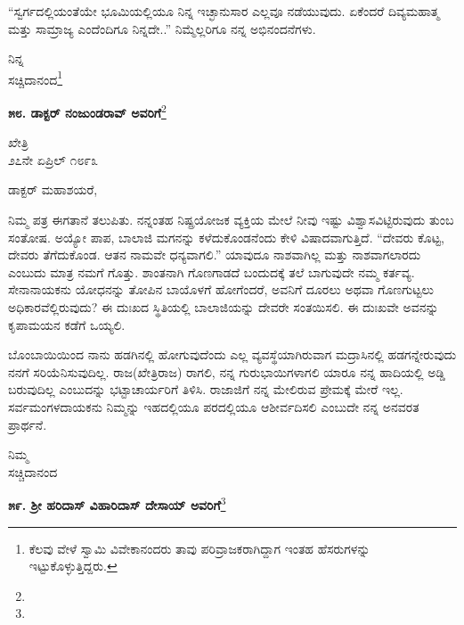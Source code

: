 “ಸ್ವರ್ಗದಲ್ಲಿಯಂತೆಯೇ ಭೂಮಿಯಲ್ಲಿಯೂ ನಿನ್ನ ಇಚ್ಛಾನುಸಾರ ಎಲ್ಲವೂ ನಡೆಯುವುದು. ಏಕೆಂದರೆ ದಿವ್ಯಮಹಾತ್ಮ ಮತ್ತು ಸಾಮ್ರಾಜ್ಯ ಎಂದೆಂದಿಗೂ ನಿನ್ನದೇ..” ನಿಮ್ಮೆಲ್ಲರಿಗೂ ನನ್ನ ಅಭಿನಂದನೆಗಳು.

\vspace{-0.45cm}

{\flushright
ನಿನ್ನ\\ಸಚ್ಚಿದಾನಂದ\footnote{ಕೆಲವು ವೇಳೆ ಸ್ವಾಮಿ ವಿವೇಕಾನಂದರು ತಾವು ಪರಿವ್ರಾಜಕರಾಗಿದ್ದಾಗ ಇಂತಹ ಹೆಸರುಗಳನ್ನು ಇಟ್ಟುಕೊಳ್ಳುತ್ತಿದ್ದರು.}\par}

\begin{center}
\textbf{೫೮. ಡಾಕ್ಟರ್ ನಂಜುಂಡರಾವ್ ಅವರಿಗೆ}\footnote{}
\end{center}

\vspace{-0.5cm}

\begin{flushright}
ಖೇತ್ರಿ\\೨೭ನೇ ಏಪ್ರಿಲ್ ೧೮೯೩
\end{flushright}

\noindent
ಡಾಕ್ಟರ್ ಮಹಾಶಯರೆ,

ನಿಮ್ಮ ಪತ್ರ ಈಗತಾನೆ ತಲುಪಿತು. ನನ್ನಂತಹ ನಿಷ್ಪ್ರಯೋಜಕ ವ್ಯಕ್ತಿಯ ಮೇಲೆ ನೀವು ಇಷ್ಟು ವಿಶ್ವಾಸವಿಟ್ಟಿರುವುದು ತುಂಬ ಸಂತೋಷ. ಅಯ್ಯೋ ಪಾಪ, ಬಾಲಾಜಿ ಮಗನನ್ನು ಕಳೆದುಕೊಂಡನೆಂದು ಕೇಳಿ ವಿಷಾದವಾಗುತ್ತಿದೆ. “ದೇವರು ಕೊಟ್ಟ, ದೇವರು ತೆಗೆದುಕೊಂಡ. ಆತನ ನಾಮವೇ ಧನ್ಯವಾಗಲಿ.” ಯಾವುದೂ ನಾಶವಾಗಿಲ್ಲ ಮತ್ತು ನಾಶವಾಗಲಾರದು ಎಂಬುದು ಮಾತ್ರ ನಮಗೆ ಗೊತ್ತು. ಶಾಂತನಾಗಿ ಗೊಣಗಾಡದೆ ಬಂದುದಕ್ಕೆ ತಲೆ ಬಾಗುವುದೇ ನಮ್ಮ ಕರ್ತವ್ಯ. ಸೇನಾನಾಯಕನು ಯೋಧನನ್ನು ತೋಪಿನ ಬಾಯೊಳಗೆ ಹೋಗೆಂದರೆ, ಅವನಿಗೆ ದೂರಲು ಅಥವಾ ಗೊಣಗುಟ್ಟಲು ಅಧಿಕಾರವೆಲ್ಲಿರುವುದು? ಈ ದುಃಖದ ಸ್ಥಿತಿಯಲ್ಲಿ ಬಾಲಾಜಿಯನ್ನು ದೇವರೇ ಸಂತಯಿಸಲಿ. ಈ ದುಃಖವೇ ಅವನನ್ನು ಕೃಪಾಮಯನ ಕಡೆಗೆ ಒಯ್ಯಲಿ.

ಬೊಂಬಾಯಿಯಿಂದ ನಾನು ಹಡಗಿನಲ್ಲಿ ಹೋಗುವುದೆಂದು ಎಲ್ಲ ವ್ಯವಸ್ಥೆಯಾಗಿರುವಾಗ ಮದ್ರಾಸಿನಲ್ಲಿ ಹಡಗನ್ನೇರುವುದು ನನಗೆ ಸರಿಯೆನಿಸುವುದಿಲ್ಲ. ರಾಜ(ಖೇತ್ರಿರಾಜ) ರಾಗಲಿ, ನನ್ನ ಗುರುಭಾಯಿಗಳಾಗಲಿ ಯಾರೂ ನನ್ನ ಹಾದಿಯಲ್ಲಿ ಅಡ್ಡಿ ಬರುವುದಿಲ್ಲ ಎಂಬುದನ್ನು ಭಟ್ಟಾಚಾರ್ಯರಿಗೆ ತಿಳಿಸಿ. ರಾಜಾಜಿಗೆ ನನ್ನ ಮೇಲಿರುವ ಪ್ರೇಮಕ್ಕೆ ಮೇರೆ ಇಲ್ಲ. ಸರ್ವಮಂಗಳದಾಯಕನು ನಿಮ್ಮನ್ನು ಇಹದಲ್ಲಿಯೂ ಪರದಲ್ಲಿಯೂ ಆಶೀರ್ವದಿಸಲಿ ಎಂಬುದೇ ನನ್ನ ಅನವರತ ಪ್ರಾರ್ಥನೆ.

\vspace{-0.6cm}

{\flushright
ನಿಮ್ಮ\\ಸಚ್ಚಿದಾನಂದ\par}

\begin{center}
\textbf{೫೯. ಶ‍್ರೀ ಹರಿದಾಸ್ ವಿಹಾರಿದಾಸ್‌ ದೇಸಾಯ್ ಅವರಿಗೆ}\footnote{}
\end{center}

